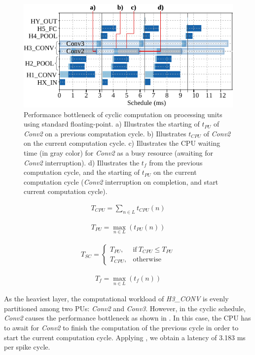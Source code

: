 \begin{figure}[h!]
	\centering
	\includegraphics[width=1\columnwidth]{../figures/latency_fp_cycle.pdf}
	\caption{Performance bottleneck of cyclic computation on processing units using standard floating-point. a) Illustrates the starting of $t_{PU}$ of \emph{Conv2} on a previous computation cycle. b) Illustrates $t_{CPU}$ of \emph{Conv2} on the current computation cycle. c) Illustrates the CPU waiting time (in gray color) for \emph{Conv2} as a busy resource (awaiting for \emph{Conv2} interruption). d) Illustrates the $t_{f}$ from the previous computation cycle, and the starting of $t_{PU}$ on the current computation cycle (\emph{Conv2} interruption on completion, and start current computation cycle).}
	\label{fig:latency_pu_fp_cycle}
\end{figure}

\begin{eqnarray} \label{eq:time_cpu}
T_{CPU} = \sum_{n\in L} t_{CPU}(n)
\end{eqnarray}

\begin{eqnarray} \label{eq:time_pu}
T_{PU} = \max_{n\in L}(t_{PU}(n))
\end{eqnarray}

\begin{eqnarray} \label{eq:time_spike}
T_{SC} =
\begin{cases}
T_{PU}, & \text{if}\ T_{CPU}\le T_{PU} \\
T_{CPU}, & \text{otherwise}
\end{cases}
\end{eqnarray}

\begin{eqnarray} \label{eq:time_finish}
T_{f} = \max_{n\in L}(t_{f}(n))
\end{eqnarray}

As the heaviest layer, the computational workload of \emph{H3\_CONV} is evenly partitioned among two PUs: \emph{Conv2} and \emph{Conv3}. However, in the cyclic schedule, \emph{Conv2} causes the performance bottleneck as shown in . In this case, the CPU has to await for \emph{Conv2} to finish the computation of the previous cycle in order to start the current computation cycle. Applying , we obtain a latency of 3.183 ms per spike cycle.


